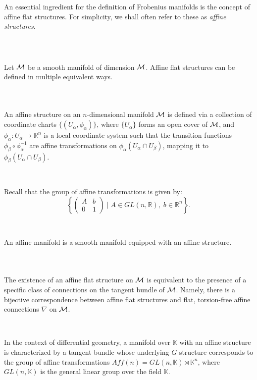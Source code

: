 An essential ingredient for the definition of Frobenius manifolds is the concept of affine flat structures. For simplicity, we shall often refer to these as {\it affine structures}.

\,

\subsection{}
Let $\mathcal{M}$ be a smooth manifold of dimension $\mathcal{M}$. Affine flat structures can be defined in multiple equivalent ways.

\,
\subsubsection{}
An affine structure on an $n$-dimensional manifold $\mathcal{M}$ is defined via a collection of coordinate charts $\{(U_\alpha, \phi_\alpha)\}$, where $\{U_\alpha\}$ forms an open cover of $\mathcal{M}$, and $\phi_\alpha: U_\alpha \to \mathbb{R}^n$ is a local coordinate system such that the transition functions $\phi_\beta \circ \phi_\alpha^{-1}$ are affine transformations on $\phi_\alpha(U_\alpha \cap U_\beta)$, mapping it to $\phi_\beta(U_\alpha \cap U_\beta)$.

\,

Recall that the group of affine transformations is given by:
\[
\left\{
\begin{pmatrix}
A & b \\ 
0 & 1
\end{pmatrix}
\; \bigg\vert \; A \in GL(n,\mathbb{R}), \; b \in \mathbb{R}^n
\right\}.
\]

\,

\begin{definition}
An affine manifold is a smooth manifold equipped with an affine structure.
\end{definition}

\,
\subsubsection{}
The existence of an affine flat structure on $\mathcal{M}$ is equivalent to the presence of a specific class of connections on the tangent bundle of $\mathcal{M}$. Namely, there is a bijective correspondence between affine flat structures and flat, torsion-free affine connections $\nabla$ on $\mathcal{M}$.

\,

In the context of differential geometry, a manifold over $\mathbb{K}$ with an affine structure is characterized by a tangent bundle whose underlying $G$-structure corresponds to the group of affine transformations $Aff(n) = GL(n, \mathbb{K}) \rtimes \mathbb{K}^n$, where $GL(n, \mathbb{K})$ is the general linear group over the field $\mathbb{K}$.

